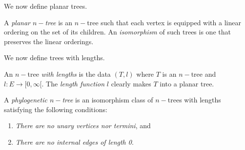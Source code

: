 We now define planar trees.

\begin{defn}\label{plts}
	A \emph{planar $n-$tree} is an $n-$tree such that each vertex is equipped with a linear ordering on the set of its children. An \emph{isomorphism} of such trees is one that preserves the linear orderings.
\end{defn}

We now define trees with lengths.

\begin{defn}\label{twl}
	An $n-$tree \emph{with lengths} is the data $(T,l)$ where $T$ is an $n-$tree and $l : E \to [0, \infty[$. The \emph{length function} $l$ clearly makes $T$ into a planar tree.
\end{defn}

\begin{defn}\label{phts}
	A \emph{phylogenetic $n-$tree} is an isomorphism class of $n-$trees with lengths satisfying the following conditions:
	\begin{enumerate}
		\item \emph{There are no unary vertices nor termini}, and
		\item \emph{There are no internal edges of length 0}.
	\end{enumerate}
\end{defn}

